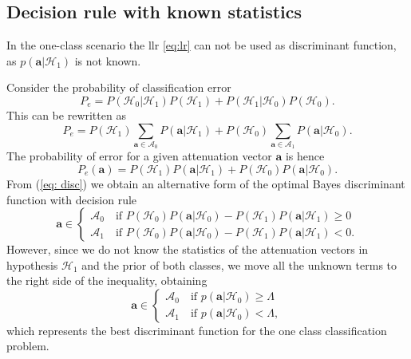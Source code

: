 \documentclass[draftcls,onecolumn,12pt]{IEEEtran}
\begin{document}
\subsection{Decision rule with known statistics}\label{sec:oneClassOpt}
In the one-class scenario the \ac{llr} \eqref{eq:lr} can not be used as discriminant function, as $p(\mathbf{a}|\mathcal{H}_1)$ is not known.

Consider the probability of classification error
\begin{equation}
    P_e = P\left(\mathcal{H}_0|\mathcal{H}_1 \right)P\left( \mathcal{H}_1\right)+P\left(\mathcal{H}_1|\mathcal{H}_0 \right)P\left( \mathcal{H}_0\right).
\end{equation}
This can be rewritten as
\begin{equation}
   P_e = P\left( \mathcal{H}_1\right)\sum_{\bm{a} \in \mathcal{A}_0}P\left(\bm{a}|\mathcal{H}_1\right)+P\left( \mathcal{H}_0\right)\sum_{\bm{a} \in \mathcal{A}_1}P\left(\bm{a}|\mathcal{H}_0\right). 
\end{equation}
The probability of error for a given attenuation vector $\bm{a}$ is hence
\begin{equation}\label{eq: disc}
    P_e(\bm{a}) = P\left( \mathcal{H}_1\right)P\left(\bm{a}|\mathcal{H}_1\right)+P\left( \mathcal{H}_0\right)P\left(\bm{a}|\mathcal{H}_0\right).
\end{equation}
From (\ref{eq: disc}) we obtain an alternative form of the optimal Bayes discriminant function with decision rule
\begin{equation}
    \bm{a} \in 
    \begin{cases}
    \mathcal{A}_0 \quad \text{if } P\left( \mathcal{H}_0\right)P\left(\bm{a}|\mathcal{H}_0\right)-P\left( \mathcal{H}_1\right)P\left(\bm{a}|\mathcal{H}_1\right) \geq 0 \\
\mathcal{A}_1 \quad \text{if }
P\left( \mathcal{H}_0\right)P\left(\bm{a}|\mathcal{H}_0\right)-P\left( \mathcal{H}_1\right)P\left(\bm{a}|\mathcal{H}_1\right) < 0. 
    \end{cases}
\end{equation}
However, since we do not know the statistics of the attenuation vectors in hypothesis $\mathcal{H}_1$ and the prior of both classes, we move all the unknown terms to the right side of the inequality, obtaining  
\begin{equation}
\label{eq:oneClassDec}
\mathbf{a} \in
\begin{cases}
\mathcal{A}_0 \quad \text{if } p(\mathbf{a}|\mathcal{H}_0) \geq \Lambda \\
\mathcal{A}_1 \quad \text{if } p(\mathbf{a}|\mathcal{H}_0) < \Lambda,
\end{cases}
\end{equation}
which represents the best discriminant function for the one class classification problem.
\end{document}
